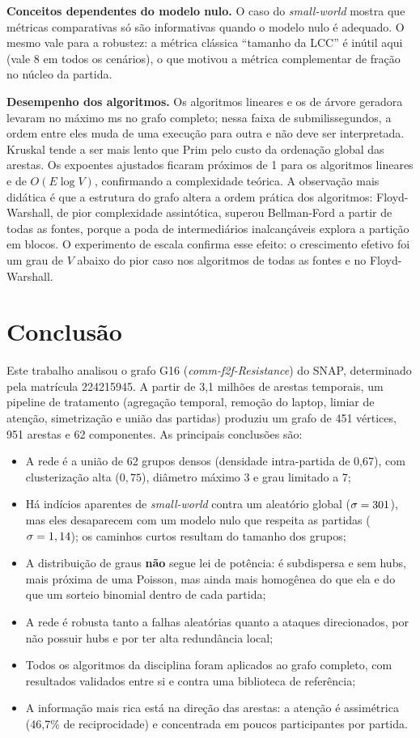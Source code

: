 \documentclass[sigconf]{webmedia}
\begin{document}
\textbf{Conceitos dependentes do modelo nulo.} O caso do \textit{small-world} mostra que métricas comparativas só são informativas quando o modelo nulo é adequado. O mesmo vale para a robustez: a métrica clássica ``tamanho da LCC'' é inútil aqui (vale 8 em todos os cenários), o que motivou a métrica complementar de fração no núcleo da partida.

\textbf{Desempenho dos algoritmos.} Os algoritmos lineares e os de árvore geradora levaram no máximo \tempoMaxLinear{} ms no grafo completo; nessa faixa de submilissegundos, a ordem entre eles muda de uma execução para outra e não deve ser interpretada. Kruskal tende a ser mais lento que Prim pelo custo da ordenação global das arestas. Os expoentes ajustados ficaram próximos de 1 para os algoritmos lineares e de $O(E \log V)$, confirmando a complexidade teórica. A observação mais didática é que a estrutura do grafo altera a ordem prática dos algoritmos: Floyd-Warshall, de pior complexidade assintótica, superou Bellman-Ford a partir de todas as fontes, porque a poda de intermediários inalcançáveis explora a partição em blocos. O experimento de escala confirma esse efeito: o crescimento efetivo foi um grau de $V$ abaixo do pior caso nos algoritmos de todas as fontes e no Floyd-Warshall.

\section{Conclusão}
\label{sec:conclusao}
Este trabalho analisou o grafo G16 (\textit{comm-f2f-Resistance}) do SNAP, determinado pela matrícula 224215945. A partir de 3,1 milhões de arestas temporais, um pipeline de tratamento (agregação temporal, remoção do laptop, limiar de atenção, simetrização e união das partidas) produziu um grafo de 451 vértices, 951 arestas e 62 componentes. As principais conclusões são:

\begin{itemize}
  \item A rede é a união de 62 grupos densos (densidade intra-partida de 0,67), com clusterização alta ($0{,}75$), diâmetro máximo 3 e grau limitado a 7;
  \item Há indícios aparentes de \textit{small-world} contra um aleatório global ($\sigma = 301$), mas eles desaparecem com um modelo nulo que respeita as partidas ($\sigma = 1,14$); os caminhos curtos resultam do tamanho dos grupos;
  \item A distribuição de graus \textbf{não} segue lei de potência: é subdispersa e sem hubs, mais próxima de uma Poisson, mas ainda mais homogênea do que ela e do que um sorteio binomial dentro de cada partida;
  \item A rede é robusta tanto a falhas aleatórias quanto a ataques direcionados, por não possuir hubs e por ter alta redundância local;
  \item Todos os algoritmos da disciplina foram aplicados ao grafo completo, com resultados validados entre si e contra uma biblioteca de referência;
  \item A informação mais rica está na direção das arestas: a atenção é assimétrica (46,7\% de reciprocidade) e concentrada em poucos participantes por partida.
\end{itemize}
\end{document}

